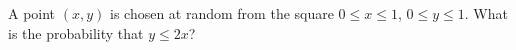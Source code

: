 A point $(x,y)$ is chosen at random from the square $0\le x\le1$, $0\le y\le1$. What is the probability that $y\le2x$?
